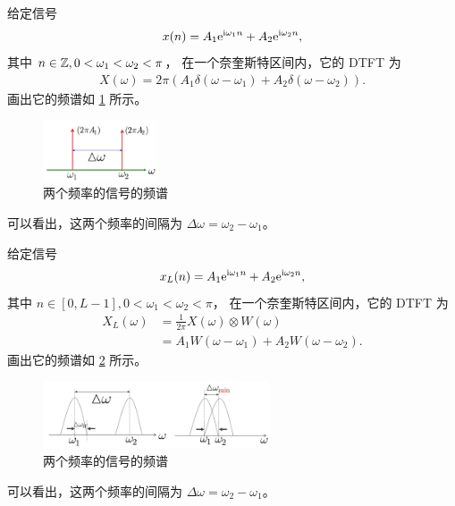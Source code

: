 \begin{example}
    给定信号
    \begin{align*}
        x(n) = A_1\mathrm{e}^{\mathrm{i}\omega_1 n} + A_2\mathrm{e}^{\mathrm{i}\omega_2 n},
    \end{align*}
    其中 $n \in \mathbb{Z}, 0 < \omega_1 < \omega_2 < \pi$，
    在一个奈奎斯特区间内，它的 DTFT 为
    \begin{align*}
        X(\omega) = 2\pi(A_1\delta(\omega - \omega_1) + A_2\delta(\omega - \omega_2)).
    \end{align*}
    画出它的频谱如 \ref{fig:DTFT_two_freqs.png} 所示。
    \begin{figure}[H]
        \centering
        \includegraphics[width=0.3\textwidth]{chap3/img/DTFT_two_freqs.png}
        \caption{两个频率的信号的频谱}
        \label{fig:DTFT_two_freqs.png}
    \end{figure}
    可以看出，这两个频率的间隔为 $\Delta\omega = \omega_2 - \omega_1$。
\end{example}

\begin{example}
    给定信号
    \begin{align*}
        x_L(n) = A_1\mathrm{e}^{\mathrm{i}\omega_1 n} + A_2\mathrm{e}^{\mathrm{i}\omega_2 n},
    \end{align*}
    其中 $n \in [0, L-1], 0 < \omega_1 < \omega_2 < \pi$，
    在一个奈奎斯特区间内，它的 DTFT 为
    \begin{align*}
        X_L(\omega) & = \frac{1}{2\pi}X(\omega) \otimes W(\omega) \\
        & = A_1W(\omega - \omega_1) + A_2W(\omega - \omega_2).
    \end{align*}
    画出它的频谱如 \ref{fig:DTFT_two_freqs_window.png} 所示。
    \begin{figure}[H]
        \centering
        \includegraphics[width=0.6\textwidth]{chap3/img/DTFT_two_freqs_window.png}
        \caption{两个频率的信号的频谱}
        \label{fig:DTFT_two_freqs_window.png}
    \end{figure}
    可以看出，这两个频率的间隔为 $\Delta\omega = \omega_2 - \omega_1$。
\end{example}

